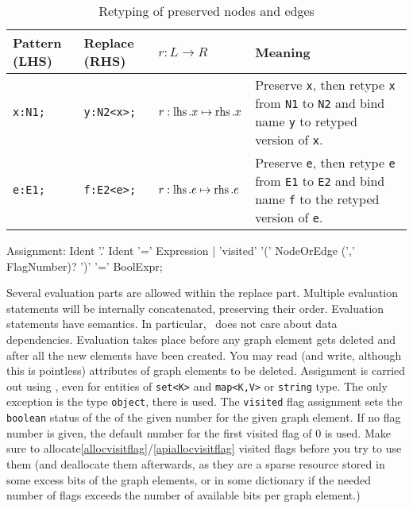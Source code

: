 \begin{table}[htbp]
\centering
\begin{tabularx}{\linewidth}{lllX}
  \textbf{Pattern (LHS)} & \textbf{Replace (RHS)} & \textbf{$r: L \longrightarrow R$} & \textbf{Meaning} \\ \hline 
  \texttt{x:N1;} & \texttt{y:N2<x>;}          & $r:\operatorname{lhs}.x \mapsto \operatorname{rhs}.x$ & Preserve \texttt{x}, then retype \texttt{x} from \texttt{N1} to \texttt{N2} and bind name \texttt{y} to retyped version of \texttt{x}.\\
  \texttt{e:E1;} & \texttt{f:E2<e>;}          & $r:\operatorname{lhs}.e \mapsto \operatorname{rhs}.e$ & Preserve \texttt{e}, then retype \texttt{e} from \texttt{E1} to \texttt{E2} and bind name \texttt{f} to the retyped version of \texttt{e}.\\
\end{tabularx}
\caption{Retyping of preserved nodes and edges}
\label{rule:retyping_graphlets}
\end{table}

\begin{rail}    
   Assignment: Ident '.' Ident '=' Expression | 'visited' '(' NodeOrEdge (',' FlagNumber)? ')' '=' BoolExpr;
\end{rail}
Several evaluation parts are allowed within the replace part. Multiple evaluation statements will be internally concatenated, preserving their order. Evaluation statements have  semantics. In particular, \GrG\ does not care about data dependencies. Evaluation takes place before any graph element gets deleted and after all the new elements have been created. You may read (and write, although this is pointless) attributes of graph elements to be deleted.
Assignment is carried out using , even for entities of \verb#set<K># and \verb#map<K,V># or \texttt{string} type. The only exception is the type \texttt{object}, there  is used.
The \texttt{visited} flag assignment sets the \texttt{boolean} status of the  of the given number for the given graph element. If no flag number is given, the default number for the first visited flag of 0 is used. Make sure to allocate\ref{allocvisitflag}/\ref{apiallocvisitflag} visited flags before you try to use them (and deallocate them afterwards, as they are a sparse resource stored in some excess bits of the graph elements, or in some dictionary if the needed number of flags exceeds the number of available bits per graph element.)

